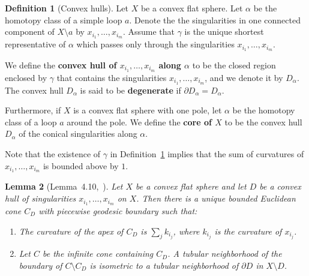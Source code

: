 \documentclass{compositio}
\numberwithin{equation}{section}
\numberwithin{figure}{section}
\theoremstyle{definition}
\newtheorem{definition}{Definition}[section]
\theoremstyle{plain}
\newtheorem{lemma}[definition]{Lemma}
\begin{document}
{\begin{definition}[Convex hulls]\label{def:convexhull}
Let $X$ be a convex flat sphere. Let $\alpha$ be the homotopy class of a simple loop $a$. Denote the the singularities in one connected component of $X\setminus a$ by $x_{i_1},\ldots,x_{i_m}$. Assume that $\gamma$ is the unique shortest representative of $\alpha$ which passes only through the singularities ${x_{i_1},\ldots,x_{i_m}}$.

We define the \textbf{convex hull of $x_{i_1}, \ldots, x_{i_m}$ along $\alpha$} to be the closed region enclosed by $\gamma$ that contains the singularities $x_{i_1}, \ldots, x_{i_m}$, and we denote it by $D_{\alpha}$. The convex hull $D_{\alpha}$ is said to be \textbf{degenerate} if $\partial D_{\alpha} = D_{\alpha}$.

Furthermore, if $X$ is a convex flat sphere with one pole, let $\alpha$ be the homotopy class of a loop $a$ around the pole. We define the \textbf{core of $X$} to be the convex hull $D_{\alpha}$ of the conical singularities along $\alpha$.
\end{definition}

Note that the existence of $\gamma$ in Definition~\ref{def:convexhull} implies that the sum of curvatures of $x_{i_1},\ldots,x_{i_m}$ is bounded above by $1$.
 
\begin{lemma}[Lemma~4.10,~\cite{fu2024uniformlengthestimatestrajectories}]\label{lem:uniquereplacementcone}
    Let $X$ be a convex flat sphere and let $D$ be a convex hull of singularities $x_{i_1},\ldots,x_{i_m}$ on $X$. Then there is a unique bounded Euclidean cone $C_D$ with piecewise geodesic boundary such that:
\begin{enumerate}
    \item The curvature of the apex of $C_D$ is $\sum_j k_{i_j}$, where $k_{i_j}$ is the curvature of $x_{i_j}$.

    \item Let $C$ be the infinite cone containing $C_D$. A tubular neighborhood of the boundary of $C\setminus C_D$ is isometric to a tubular neighborhood of $\partial D$ in $X\setminus D$. 
\end{enumerate}     
\end{lemma}


}
\end{document}
